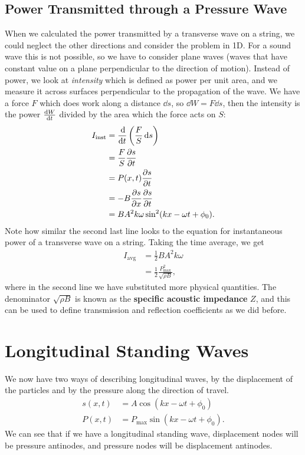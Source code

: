 \documentclass[../classical_mechanics.tex]{subfiles}
\begin{document}
        \subsection{Power Transmitted through a Pressure Wave}\label{subsec:power-transmitted-through-a-pressure-wave}
            When we calculated the power transmitted by a transverse wave on a string, we could neglect the other directions and consider the problem in 1D.
            For a sound wave this is not possible, so we have to consider plane waves (waves that have constant value on a plane perpendicular to the direction of motion).
            Instead of power, we look at \textit{intensity} which is defined as power per unit area, and we measure it across surfaces perpendicular to the propagation of the wave.
            We have a force $F$ which does work along a distance $\dd{s}$, so $\dd{W}=F\dd{s}$, then the intensity is the power $\dv{W}{t}$ divided by the area which the force acts on $S$:
            \begin{align}
                I_\text{inst}&=\dv{}{t}\left(\frac{F}{S}\dd{s}\right)\\
                &=\frac{F}{S}\pdv{s}{t}\\
                &=P(x,t)\pdv{s}{t}\\
                &=-B\pdv{s}{x}\pdv{s}{t}\\
                &=BA^2k\omega\sin^2(kx-\omega t+\phi_0).
            \end{align}
            Note how similar the second last line looks to the equation for instantaneous power of a transverse wave on a string.
            Taking the time average, we get
            \begin{align}
                I_\text{avg}&=\frac{1}{2}BA^2k\omega\\
                &=\frac{1}{2}\frac{P_\text{max}^2}{\sqrt{\rho B}},
            \end{align}
            where in the second line we have substituted more physical quantities.
            The denominator $\sqrt{\rho B}$ is known as the \textbf{specific acoustic impedance} $Z$, and this can be used to define transmission and reflection coefficients as we did before.

    \section{Longitudinal Standing Waves}\label{sec:longitudinal-standing-waves}
        We now have two ways of describing longitudinal waves, by the displacement of the particles and by the pressure along the direction of travel.
        \begin{align}
            s(x,t)&=A\cos(kx-\omega t+\phi_0)\\
            P(x,t)&=P_\text{max}\sin(kx-\omega t+\phi_0).
        \end{align}
        We can see that if we have a longitudinal standing wave, displacement nodes will be pressure antinodes, and pressure nodes will be displacement antinodes.
\end{document}
